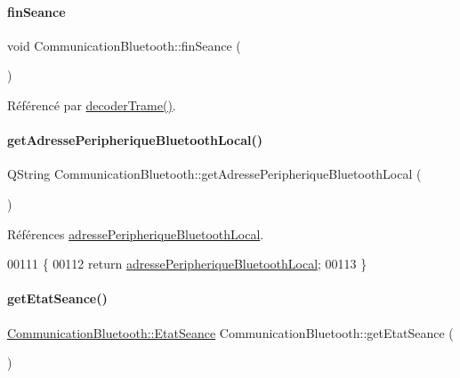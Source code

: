 \paragraph{\texorpdfstring{fin\+Seance}{finSeance}}
{\footnotesize\ttfamily void Communication\+Bluetooth\+::fin\+Seance (\begin{DoxyParamCaption}{ }\end{DoxyParamCaption})\hspace{0.3cm}{\ttfamily [signal]}}



Référencé par \hyperlink{class_communication_bluetooth_a6b53f12131d9323cec8f2a03fe716e6a}{decoder\+Trame()}.

\mbox{\label{class_communication_bluetooth_affe39c52a35aec101c04d333b6249162}} 
\paragraph{\texorpdfstring{get\+Adresse\+Peripherique\+Bluetooth\+Local()}{getAdressePeripheriqueBluetoothLocal()}}
{\footnotesize\ttfamily Q\+String Communication\+Bluetooth\+::get\+Adresse\+Peripherique\+Bluetooth\+Local (\begin{DoxyParamCaption}{ }\end{DoxyParamCaption})}



Références \hyperlink{class_communication_bluetooth_a972265a71842606740b53560a7fc0e53}{adresse\+Peripherique\+Bluetooth\+Local}.


\begin{DoxyCode}
00111 \{
00112     \textcolor{keywordflow}{return} \hyperlink{class_communication_bluetooth_a972265a71842606740b53560a7fc0e53}{adressePeripheriqueBluetoothLocal};
00113 \}
\end{DoxyCode}
\mbox{\label{class_communication_bluetooth_a20e0994e602bb0faa73111c9f10ccbe5}} 
\paragraph{\texorpdfstring{get\+Etat\+Seance()}{getEtatSeance()}\hspace{0.1cm}{\footnotesize\ttfamily [1/2]}}
{\footnotesize\ttfamily \hyperlink{class_communication_bluetooth_a49447c8601e9214495f61f4f393e2133}{Communication\+Bluetooth\+::\+Etat\+Seance} Communication\+Bluetooth\+::get\+Etat\+Seance (\begin{DoxyParamCaption}{ }\end{DoxyParamCaption})}



